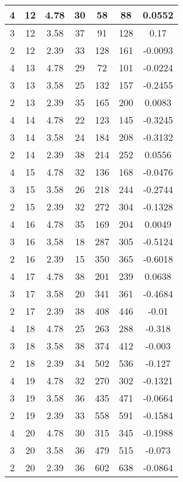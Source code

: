 \documentclass[letterpaper, 12pt]{article}
\begin{document}
\begin{longtable}{|c|c|c|c|c|c|c|}
\hline
4 & 12 & 4.78 & 30 & 58 & 88 & 0.0552 \\
\hline
3 & 12 & 3.58 & 37 & 91 & 128 & 0.17 \\
\hline
2 & 12 & 2.39 & 33 & 128 & 161 & -0.0093 \\
\hline
4 & 13 & 4.78 & 29 & 72 & 101 & -0.0224 \\
\hline
3 & 13 & 3.58 & 25 & 132 & 157 & -0.2455 \\
\hline
2 & 13 & 2.39 & 35 & 165 & 200 & 0.0083 \\
\hline
4 & 14 & 4.78 & 22 & 123 & 145 & -0.3245 \\
\hline
3 & 14 & 3.58 & 24 & 184 & 208 & -0.3132 \\
\hline
2 & 14 & 2.39 & 38 & 214 & 252 & 0.0556 \\
\hline
4 & 15 & 4.78 & 32 & 136 & 168 & -0.0476 \\
\hline
3 & 15 & 3.58 & 26 & 218 & 244 & -0.2744 \\
\hline
2 & 15 & 2.39 & 32 & 272 & 304 & -0.1328 \\
\hline
4 & 16 & 4.78 & 35 & 169 & 204 & 0.0049 \\
\hline
3 & 16 & 3.58 & 18 & 287 & 305 & -0.5124 \\
\hline
2 & 16 & 2.39 & 15 & 350 & 365 & -0.6018 \\
\hline
4 & 17 & 4.78 & 38 & 201 & 239 & 0.0638 \\
\hline
3 & 17 & 3.58 & 20 & 341 & 361 & -0.4684 \\
\hline
2 & 17 & 2.39 & 38 & 408 & 446 & -0.01 \\
\hline
4 & 18 & 4.78 & 25 & 263 & 288 & -0.318 \\
\hline
3 & 18 & 3.58 & 38 & 374 & 412 & -0.003 \\
\hline
2 & 18 & 2.39 & 34 & 502 & 536 & -0.127 \\
\hline
4 & 19 & 4.78 & 32 & 270 & 302 & -0.1321 \\
\hline
3 & 19 & 3.58 & 36 & 435 & 471 & -0.0664 \\
\hline
2 & 19 & 2.39 & 33 & 558 & 591 & -0.1584 \\
\hline
4 & 20 & 4.78 & 30 & 315 & 345 & -0.1988 \\
\hline
3 & 20 & 3.58 & 36 & 479 & 515 & -0.073 \\
\hline
2 & 20 & 2.39 & 36 & 602 & 638 & -0.0864 \\
\hline
\end{longtable}
\end{document}
